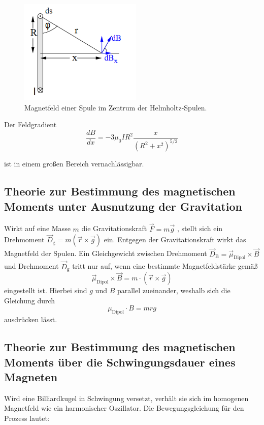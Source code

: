 \begin{figure}[H]
  \centering
  \includegraphics[height=5cm]{Screenshot (6)}
  \caption{Magnetfeld einer Spule im Zentrum der Helmholtz-Spulen. \cite[S. 1]{kent}}
  \label{fig:drill}
\end{figure}

\noindent Der Feldgradient 
\begin{equation}
    \frac{dB}{dx} = -3\mu_\text{0}IR^2 \frac{x}{(R^2+x^2)^{5/2}}
\end{equation}

\noindent ist in einem großen Bereich vernachlässigbar.




\subsection{Theorie zur Bestimmung des magnetischen Moments unter Ausnutzung der Gravitation}
Wirkt auf eine Masse $m$ die Gravitationskraft $\vec{F} = m \vec{g}$ , stellt sich ein Drehmoment $\vec{D}_\text{g}= m (\vec{r} \times \vec{g}) $ ein.
Entgegen der Gravitationskraft wirkt das Magnetfeld der Spulen. Ein Gleichgewicht zwischen Drehmoment $\vec{D}_\text{B} = \vec{\mu}_\text{Dipol} \times \vec{B}$
 und Drehmoment $\vec{D}_\text{g}$ tritt nur auf, wenn eine bestimmte Magnetfeldstärke gemäß
\begin{equation}
   \vec{\mu}_\text{Dipol}\times\vec{B} = m \cdot (\vec{r}\times\vec{g})
\end{equation}
eingestellt ist. Hierbei sind $g$ und $B$ parallel zueinander, weshalb sich die Gleichung durch
\begin{equation}
    \mu_\text{Dipol}\cdot B = m r g
\end{equation}
ausdrücken lässt.

\subsection{Theorie zur Bestimmung des magnetischen Moments über die Schwingungsdauer eines Magneten}
Wird eine Billiardkugel in Schwingung versetzt, verhält sie sich im homogenen Magnetfeld wie ein harmonischer Oszillator.
Die Bewegungsgleichung für den Prozess lautet:

